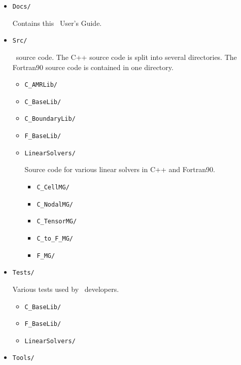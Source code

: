 \begin{itemize}

\item {\tt Docs/}

Contains this \BoxLib\ User's Guide.

\item {\tt Src/}

  \BoxLib\ source code.  The C++ source code is split into several directories.
  The Fortran90 source code is contained in one directory.

  \begin{itemize}

    \item {\tt C\_AMRLib/}
    \item {\tt C\_BaseLib/}
    \item {\tt C\_BoundaryLib/}
    \item {\tt F\_BaseLib/}
    \item {\tt LinearSolvers/}

    Source code for various linear solvers in C++ and Fortran90.

    \begin{itemize}

      \item {\tt C\_CellMG/}
      \item {\tt C\_NodalMG/}
      \item {\tt C\_TensorMG/}
      \item {\tt C\_to\_F\_MG/}
      \item {\tt F\_MG/}

    \end{itemize}

  \end{itemize}

\item {\tt Tests/}

  Various tests used by \BoxLib\ developers.

  \begin{itemize}

  \item {\tt C\_BaseLib/}
  \item {\tt F\_BaseLib/}
  \item {\tt LinearSolvers/}

  \end{itemize}

\item {\tt Tools/}

  \begin{itemize}


\end{itemize}
\end{itemize}
